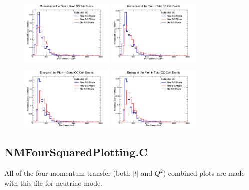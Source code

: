 \documentclass[11pt]{article}
\begin{document}
\begin{figure}[H]
\centering
\includegraphics[width=0.4\textwidth]{NMPionPlottingImages/8-NMPionPlotting.png}
\includegraphics[width=0.4\textwidth]{NMPionPlottingImages/11-NMPionPlotting.png}
\caption{}
\end{figure}

\begin{figure}[H]
\centering
\includegraphics[width=0.4\textwidth]{NMPionPlottingImages/9-NMPionPlotting.png}
\includegraphics[width=0.4\textwidth]{NMPionPlottingImages/12-NMPionPlotting.png}
\caption{}
\end{figure}

\subsection{NMFourSquaredPlotting.C}
All of the four-momentum transfer (both $|t|$ and $Q^2$) combined plots are made with this file for neutrino mode.
\end{document}
